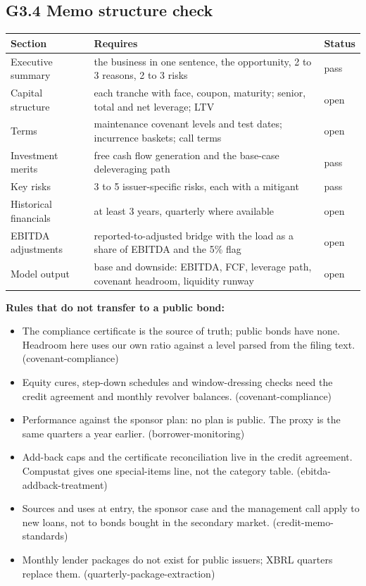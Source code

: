 \documentclass[11pt,a4paper]{article}
\begin{document}
\subsection*{G3.4 Memo structure check}
\begin{center}\footnotesize\setlength{\tabcolsep}{3.5pt}\begin{tabular}{@{}lp{9cm}l@{}}\toprule
Section & Requires & Status \\\midrule
Executive summary & the business in one sentence, the opportunity, 2 to 3 reasons, 2 to 3 risks & \textcolor{good}{pass} \\
Capital structure & each tranche with face, coupon, maturity; senior, total and net leverage; LTV & \textcolor{amber}{open} \\
Terms & maintenance covenant levels and test dates; incurrence baskets; call terms & \textcolor{amber}{open} \\
Investment merits & free cash flow generation and the base-case deleveraging path & \textcolor{good}{pass} \\
Key risks & 3 to 5 issuer-specific risks, each with a mitigant & \textcolor{good}{pass} \\
Historical financials & at least 3 years, quarterly where available & \textcolor{amber}{open} \\
EBITDA adjustments & reported-to-adjusted bridge with the load as a share of EBITDA and the 5\% flag & \textcolor{amber}{open} \\
Model output & base and downside: EBITDA, FCF, leverage path, covenant headroom, liquidity runway & \textcolor{amber}{open} \\
\bottomrule\end{tabular}\end{center}
\textbf{Rules that do not transfer to a public bond:}\begin{itemize}\item The compliance certificate is the source of truth; public bonds have none. Headroom here uses our own ratio against a level parsed from the filing text. (covenant-compliance)\item Equity cures, step-down schedules and window-dressing checks need the credit agreement and monthly revolver balances. (covenant-compliance)\item Performance against the sponsor plan: no plan is public. The proxy is the same quarters a year earlier. (borrower-monitoring)\item Add-back caps and the certificate reconciliation live in the credit agreement. Compustat gives one special-items line, not the category table. (ebitda-addback-treatment)\item Sources and uses at entry, the sponsor case and the management call apply to new loans, not to bonds bought in the secondary market. (credit-memo-standards)\item Monthly lender packages do not exist for public issuers; XBRL quarters replace them. (quarterly-package-extraction)\end{itemize}
\end{document}
